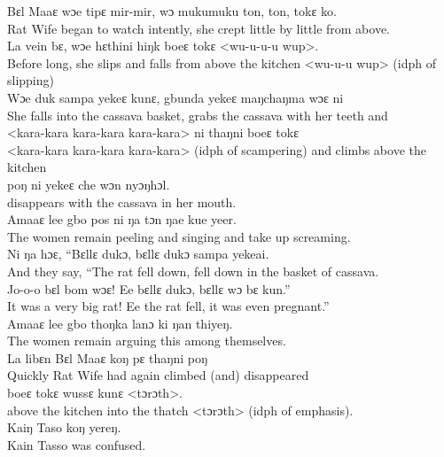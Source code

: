 Bɛl Maaɛ wɔe tipɛ mir-mir, wɔ mukumuku ton, ton, tokɛ ko.\\
Rat Wife began to watch intently, she crept little by little from above.\\

La vein bɛ, wɔe hɛthini hiŋk boeɛ tokɛ <wu-u-u-u wup>.\\
Before long, she slips and falls from above the kitchen <wu-u-u wup> (idph of slipping)\\

Wɔe duk sampa yekeɛ kunɛ, gbunda yekeɛ maŋchaŋma wɔɛ ni\\
She falls into the cassava basket, grabs the cassava with her teeth and\\

<kara-kara kara-kara kara-kara> ni thaŋni boeɛ tokɛ\\ 
<kara-kara kara-kara kara-kara> (idph of scampering) and climbs above the kitchen\\ 

poŋ ni yekeɛ che wɔn nyɔŋhɔl.\\
disappears with the cassava in her mouth.\\

Amaaɛ lee gbo pos ni ŋa tɔn ŋae kue yeer.\\
The women remain peeling and singing and take up screaming.\\

Ni ŋa hɔɛ, “Bɛllɛ dukɔ, bɛllɛ dukɔ sampa yekeai.\\
And they say, “The rat fell down, fell down in the basket of cassava.\\

Jo-o-o bɛl bom wɔɛ! Ee bɛllɛ dukɔ, bɛllɛ wɔ bɛ kun.”\\
It was a very big rat! Ee the rat fell, it was even pregnant.”\\

Amaaɛ lee gbo thoŋka lanɔ ki ŋan thiyeŋ.\\
The women remain arguing this among themselves.\\

La libɛn Bɛl Maaɛ koŋ pɛ thaŋni poŋ\\ 
Quickly Rat Wife had again climbed (and) disappeared\\ 

boeɛ tokɛ wussɛ kunɛ <tɔrɔth>.\\
above the kitchen into the thatch <tɔrɔth> (idph of emphasis).\\

Kaiŋ Taso koŋ yereŋ.\\
Kain Tasso was confused.\\

